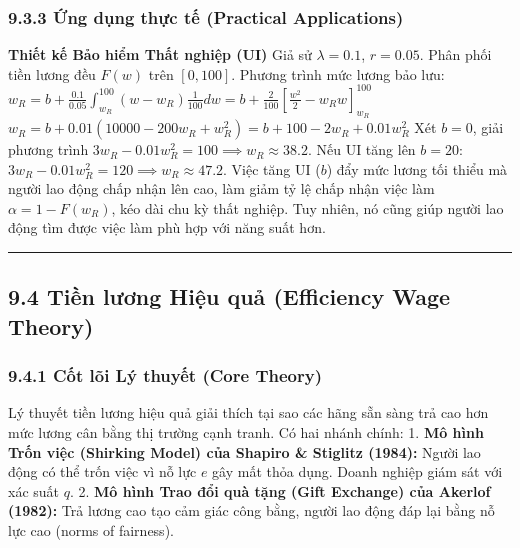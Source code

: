 \documentclass[
]{article}
\begin{document}
\subsubsection{9.3.3 Ứng dụng thực tế (Practical
Applications)}\label{ux1ee9ng-dux1ee5ng-thux1ef1c-tux1ebf-practical-applications-35}

\textbf{Thiết kế Bảo hiểm Thất nghiệp (UI)} Giả sử \(\lambda = 0.1\),
\(r=0.05\). Phân phối tiền lương đều \(F(w)\) trên \([0, 100]\). Phương
trình mức lương bảo lưu:
\(w_R = b + \frac{0.1}{0.05} \int_{w_R}^{100} (w - w_R) \frac{1}{100} dw = b + \frac{2}{100} \left[ \frac{w^2}{2} - w_R w \right]_{w_R}^{100}\)
\(w_R = b + 0.01 (10000 - 200w_R + w_R^2) = b + 100 - 2w_R + 0.01 w_R^2\)
Xét \(b=0\), giải phương trình
\(3w_R - 0.01 w_R^2 = 100 \implies w_R \approx 38.2\). Nếu UI tăng lên
\(b=20\): \(3w_R - 0.01 w_R^2 = 120 \implies w_R \approx 47.2\). Việc
tăng UI (\(b\)) đẩy mức lương tối thiểu mà người lao động chấp nhận lên
cao, làm giảm tỷ lệ chấp nhận việc làm \(\alpha = 1 - F(w_R)\), kéo dài
chu kỳ thất nghiệp. Tuy nhiên, nó cũng giúp người lao động tìm được việc
làm phù hợp với năng suất hơn.

\begin{center}\rule{0.5\linewidth}{0.5pt}\end{center}

\subsection{9.4 Tiền lương Hiệu quả (Efficiency Wage
Theory)}\label{tiux1ec1n-lux1b0ux1a1ng-hiux1ec7u-quux1ea3-efficiency-wage-theory}

\subsubsection{9.4.1 Cốt lõi Lý thuyết (Core
Theory)}\label{cux1ed1t-luxf5i-luxfd-thuyux1ebft-core-theory-35}

Lý thuyết tiền lương hiệu quả giải thích tại sao các hãng sẵn sàng trả
cao hơn mức lương cân bằng thị trường cạnh tranh. Có hai nhánh chính: 1.
\textbf{Mô hình Trốn việc (Shirking Model) của Shapiro \& Stiglitz
(1984):} Người lao động có thể trốn việc vì nỗ lực \(e\) gây mất thỏa
dụng. Doanh nghiệp giám sát với xác suất \(q\). 2. \textbf{Mô hình Trao
đổi quà tặng (Gift Exchange) của Akerlof (1982):} Trả lương cao tạo cảm
giác công bằng, người lao động đáp lại bằng nỗ lực cao (norms of
fairness).
\end{document}
